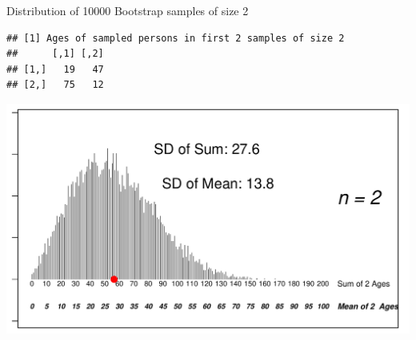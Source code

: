 \documentclass[10pt,handout]{beamer}\usepackage[]{graphicx}\usepackage[]{color}
\makeatletter
\def\maxwidth{ %
  \ifdim\Gin@nat@width>\linewidth
    \linewidth
  \else
    \Gin@nat@width
  \fi
}
\newenvironment{kframe}{%
 \def\at@end@of@kframe{}%
 \ifinner\ifhmode%
  \def\at@end@of@kframe{\end{minipage}}%
  \begin{minipage}{\columnwidth}%
 \fi\fi%
 \def\FrameCommand##1{\hskip\@totalleftmargin \hskip-\fboxsep
 \colorbox{shadecolor}{##1}\hskip-\fboxsep
     \hskip-\linewidth \hskip-\@totalleftmargin \hskip\columnwidth}%
 \MakeFramed {\advance\hsize-\width
   \@totalleftmargin\z@ \linewidth\hsize
   \@setminipage}}%
 {\par\unskip\endMakeFramed%
 \at@end@of@kframe}
\newenvironment{knitrout}{}{} %
\makeatother
\begin{document}
\begin{frame}[fragile]{Distribution of 10000 Bootstrap samples of size 2}
\begin{knitrout}\tiny
{}\color{fgcolor}\begin{kframe}
\begin{verbatim}
## [1] Ages of sampled persons in first 2 samples of size 2
##      [,1] [,2]
## [1,]   19   47
## [2,]   75   12
\end{verbatim}
\end{kframe}

{\centering \includegraphics[width=\maxwidth]{figure/unnamed-chunk-2-1} 

}


\end{knitrout}
	
\end{frame}
\end{document}
